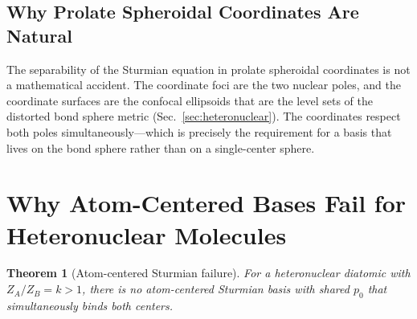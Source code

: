 \documentclass[aps,pra,twocolumn,superscriptaddress,longbibliography]{revtex4-2}
\newtheorem{theorem}{Theorem}
\begin{document}
\subsection{Why Prolate Spheroidal Coordinates Are Natural}

The separability of the Sturmian equation in prolate spheroidal
coordinates is not a mathematical accident.  The coordinate foci are
the two nuclear poles, and the coordinate surfaces are the confocal
ellipsoids that are the level sets of the distorted bond sphere metric
(Sec.~\ref{sec:heteronuclear}).  The coordinates respect both poles
simultaneously---which is precisely the requirement for a basis that
lives on the bond sphere rather than on a single-center sphere.


\section{Why Atom-Centered Bases Fail for Heteronuclear Molecules}
\label{sec:failure}

\begin{theorem}[Atom-centered Sturmian failure]
\label{thm:failure}
For a heteronuclear diatomic with $Z_A/Z_B = k > 1$, there is no
atom-centered Sturmian basis with shared $p_0$ that simultaneously
binds both centers.
\end{theorem}
\end{document}
